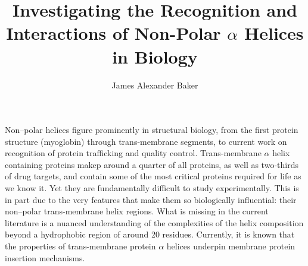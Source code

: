 \documentclass[12pt,PhD,twoside]{muthesis}
\begin{document}
\title{Investigating the Recognition and Interactions of Non-Polar \(\alpha\) Helices in Biology}
\author{James Alexander Baker}
\def\wordcount{22,000}







\beforeabstract{} %



Non\---polar helices figure prominently in structural biology, from the first protein structure (myoglobin) through trans-membrane segments, to current work on recognition of protein trafficking and quality control. Trans-membrane \(\alpha\) helix containing proteins makep around a quarter of all proteins, as well as two-thirds of drug targets, and contain some of the most critical proteins required for life as we know it. Yet they are fundamentally difficult to study experimentally. This is in part due to the very features that make them so biologically influential: their non\---polar trans-membrane helix regions. What is missing in the current literature is a nuanced understanding of the complexities of the helix composition beyond a hydrophobic region of around 20 residues. Currently, it is known that the properties of trans-membrane protein \(\alpha\) helices underpin membrane protein insertion mechanisms.
\end{document}
